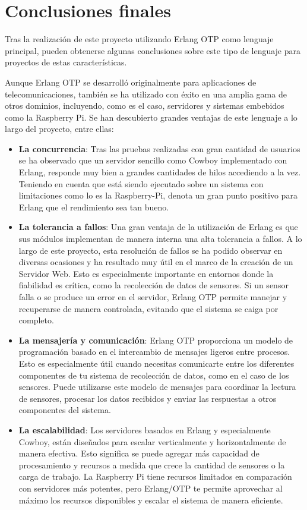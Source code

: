 \section{Conclusiones finales}

Tras la realización de este proyecto utilizando Erlang OTP como lenguaje principal, pueden obtenerse algunas conclusiones sobre este tipo de lenguaje para proyectos de estas características.

 Aunque Erlang OTP se desarrolló originalmente para aplicaciones de telecomunicaciones, también se ha utilizado con éxito en una amplia gama de otros dominios, incluyendo, como es el caso, servidores y sistemas embebidos como la Raspberry Pi. Se han descubierto grandes ventajas de este lenguaje a lo largo del proyecto, entre ellas:

 \begin{itemize}
     \item \textbf{La concurrencia}: Tras las pruebas realizadas con gran cantidad de usuarios se ha observado que un servidor sencillo como Cowboy implementado con Erlang, responde muy bien a grandes cantidades de hilos accediendo a la vez. Teniendo en cuenta que está siendo ejecutado sobre un sistema con limitaciones como lo es la Raspberry-Pi, denota un gran punto positivo para Erlang que el rendimiento sea tan bueno.
     \item \textbf{La tolerancia a fallos}: Una gran ventaja de la utilización de Erlang es que sus módulos implementan de manera interna una alta tolerancia a fallos. A lo largo de este proyecto, esta resolución de fallos se ha podido observar en diversas ocasiones y ha resultado muy útil en el marco de la creación de un Servidor Web.  Esto es especialmente importante en entornos donde la fiabilidad es crítica, como la recolección de datos de sensores. Si un sensor falla o se produce un error en el servidor, Erlang OTP permite manejar y recuperarse de manera controlada, evitando que el sistema se caiga por completo.
     \item \textbf{La mensajería y comunicación}:  Erlang OTP proporciona un modelo de programación basado en el intercambio de mensajes ligeros entre procesos. Esto es especialmente útil cuando necesitas comunicarte entre los diferentes componentes de tu sistema de recolección de datos, como en el caso de los sensores. Puede utilizarse este modelo de mensajes para coordinar la lectura de sensores, procesar los datos recibidos y enviar las respuestas a otros componentes del sistema.
    \item \textbf{La escalabilidad}: Los servidores basados en Erlang y especialmente Cowboy, están diseñados para escalar verticalmente y horizontalmente de manera efectiva. Esto significa se puede agregar más capacidad de procesamiento y recursos a medida que crece la cantidad de sensores o la carga de trabajo. La Raspberry Pi tiene recursos limitados en comparación con servidores más potentes, pero Erlang/OTP te permite aprovechar al máximo los recursos disponibles y escalar el sistema de manera eficiente.
 \end{itemize}

